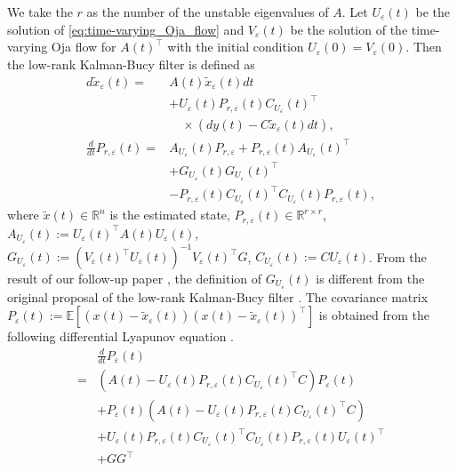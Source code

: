 \documentclass[fleqn,10pt]{SICE_FES26}
\begin{document}
We take the $r$ as the number of the unstable eigenvalues of $A$.  
Let $ U_{\varepsilon}(t)$ be the solution of \eqref{eq:time-varying_Oja_flow} and $ V_{\varepsilon}(t)$ be the solution of the time-varying Oja flow for $A(t)^{\top}$ with the initial condition $U_{\varepsilon}(0) = V_{\varepsilon}(0)$. 
Then the low-rank Kalman-Bucy filter is defined as
\begin{align*}
d \tilde{x}_{\varepsilon} (t) =& A(t) \tilde{x}_{\varepsilon}(t) dt 
\nonumber \\ & + U_{\varepsilon}(t) P_{r,\varepsilon}(t) C_{U_{\varepsilon}}(t) ^{\top} 
\nonumber \\ & \quad \times (dy(t) - C \tilde{x}_{\varepsilon}(t)dt),
\\
\frac{d}{dt} P_{r,\varepsilon} (t) =& A_{U_{\varepsilon}}(t) P_{r,\varepsilon} + P_{r,\varepsilon} (t) A_{U_{\varepsilon}}(t)^{\top} 
\nonumber \\ & + G_{U_{\varepsilon}}(t) G_{U_{\varepsilon}}(t) ^{\top} \nonumber \\ &-  P_{r,\varepsilon} (t) C_{U_{\varepsilon}}(t)^{\top} C_{U_{\varepsilon}}(t) P_{r,\varepsilon} (t),
\end{align*}
where $\tilde{x}(t) \in {\mathbb{R}}^{n}$ is the estimated state,  
$P_{r,\varepsilon} (t) \in {\mathbb{R}}^{r\times r}$, $A_{U_{\varepsilon}}(t) := U_{\varepsilon}(t)^{\top} A(t) U_{\varepsilon}(t)$, \\ $G_{U_{\varepsilon}}(t) := (V_{\varepsilon}(t)^{\top}U_{\varepsilon}(t))^{-1} V_{\varepsilon}(t)^{\top} G$, $C_{U_{\varepsilon}}(t) := C U_{\varepsilon}(t)$. 
From the result of our follow-up paper \cite{TsuzukiOhki2025global}, the definition of $G_{U_{\varepsilon}}(t)$ is different from the original proposal of the low-rank Kalman-Bucy filter \cite{yamada2020lowrank}.  
The covariance matrix $P_{\varepsilon}(t) := {\mathbb{E}}[ (x(t) - \tilde{x}_{\varepsilon}(t)) (x(t) - \tilde{x}_{\varepsilon}(t))^{\top} ] $ is obtained from the following differential Lyapunov equation \cite{yamada2020lowrank}. 
\begin{align}
&\frac{d}{dt}P_{\varepsilon}(t) 
\nonumber \\ 
= & (A(t) - U_{\varepsilon}(t) P_{r,\varepsilon} (t)C_{U_{\varepsilon}}(t)^{\top} C ) P_{\varepsilon}(t) 
\nonumber \\
&+
P_{\varepsilon}(t) (A(t) - U_{\varepsilon}(t) P_{r,\varepsilon}(t) C_{U_{\varepsilon}}(t)^{\top} C )
\nonumber \\ &
 + U_{\varepsilon}(t) P_{r,\varepsilon}(t) C_{U_{\varepsilon}}(t)^{\top} C_{U_{\varepsilon}}(t) P_{r,\varepsilon}(t) U_{\varepsilon}(t)^{\top}
 \nonumber \\ &
 + GG^{\top}
\label{eq:covariance_LRKF}
\end{align}
\end{document}
